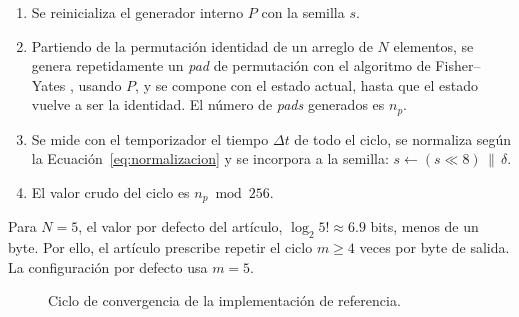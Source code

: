 \begin{enumerate}
    \item Se reinicializa el generador interno $P$ con la semilla $s$.
    \item Partiendo de la permutación identidad de un arreglo de $N$ elementos, se genera repetidamente un \textit{pad} de permutación con el algoritmo de Fisher--Yates \cite{Durstenfeld1964Algorithm235}, usando $P$, y se compone con el estado actual, hasta que el estado vuelve a ser la identidad. El número de \textit{pads} generados es $n_p$.
    \item Se mide con el temporizador el tiempo $\Delta t$ de todo el ciclo, se normaliza según la Ecuación~\eqref{eq:normalizacion} y se incorpora a la semilla: $s \leftarrow (s \ll 8) \,\|\, \delta$.
    \item El valor crudo del ciclo es $n_p \bmod 256$.
\end{enumerate}

Para $N = 5$, el valor por defecto del artículo, $\log_2 5! \approx 6.9$ bits, menos de un byte. Por ello, el artículo prescribe repetir el ciclo $m \geq 4$ veces por byte de salida. La configuración por defecto usa $m = 5$.

\begin{figure}[H]
\centering
{}
\caption{Ciclo de convergencia de la implementación de referencia.}
\label{fig:ciclo_referencia}
\end{figure}

